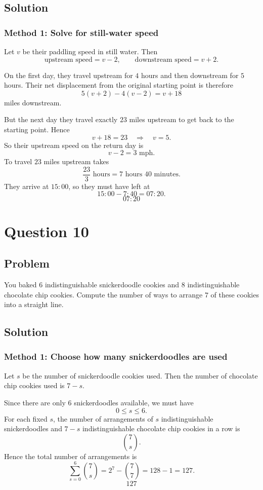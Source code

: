 \documentclass[12pt]{article}
\begin{document}
\subsection{Solution}
\subsubsection{Method 1: Solve for still-water speed}
Let $v$ be their paddling speed in still water. Then
\[
\text{upstream speed}=v-2,
\qquad
\text{downstream speed}=v+2.
\]

On the first day, they travel upstream for $4$ hours and then downstream for $5$ hours. Their net displacement from the original starting point is therefore
\[
5(v+2)-4(v-2)=v+18
\]
miles downstream.

But the next day they travel exactly $23$ miles upstream to get back to the starting point. Hence
\[
v+18=23 \quad\Rightarrow\quad v=5.
\]
So their upstream speed on the return day is
\[
v-2 = 3 \text{ mph}.
\]
To travel $23$ miles upstream takes
\[
\frac{23}{3}\text{ hours} = 7\text{ hours }40\text{ minutes}.
\]
They arrive at $15{:}00$, so they must have left at
\[
15{:}00 - 7{:}40 = 07{:}20.
\]
\[
\boxed{07{:}20}
\]

\newpage
\section{Question 10}
\subsection{Problem}
You baked $6$ indistinguishable snickerdoodle cookies and $8$ indistinguishable chocolate chip cookies. Compute the number of ways to arrange $7$ of these cookies into a straight line.

\subsection{Solution}
\subsubsection{Method 1: Choose how many snickerdoodles are used}
Let $s$ be the number of snickerdoodle cookies used. Then the number of chocolate chip cookies used is $7-s$.

Since there are only $6$ snickerdoodles available, we must have
\[
0\le s\le 6.
\]
For each fixed $s$, the number of arrangements of $s$ indistinguishable snickerdoodles and $7-s$ indistinguishable chocolate chip cookies in a row is
\[
\binom{7}{s}.
\]
Hence the total number of arrangements is
\[
\sum_{s=0}^{6} \binom{7}{s} = 2^7 - \binom{7}{7} = 128-1 = 127.
\]
\[
\boxed{127}
\]
\end{document}
